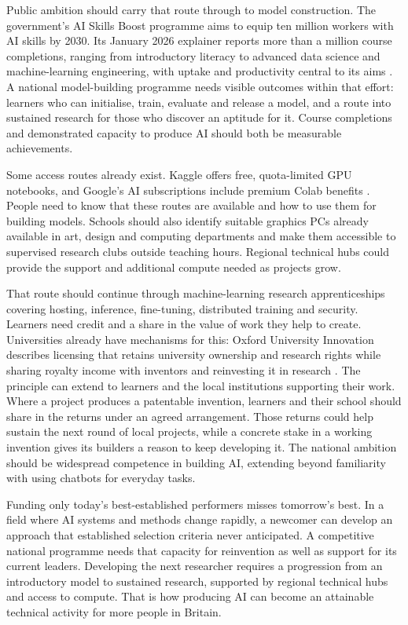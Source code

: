\documentclass[11pt,a4paper]{article}
\begin{document}
Public ambition should carry that route through to model construction.
The government's AI Skills Boost programme aims to equip ten million
workers with AI skills by 2030. Its January 2026 explainer reports more
than a million course completions, ranging from introductory literacy to
advanced data science and machine-learning engineering, with uptake and
productivity central to its aims \cite{aiskillsboost2026}. A national
model-building programme needs visible outcomes within that effort:
learners who can initialise, train, evaluate and release a model, and a
route into sustained research for those who discover an aptitude for it.
Course completions and demonstrated capacity to produce AI should both
be measurable achievements.

Some access routes already exist. Kaggle offers free, quota-limited GPU
notebooks, and Google's AI subscriptions include premium Colab benefits
\cite{kagglegpu,colab2026}. People need to know that these routes are
available and how to use them for building models. Schools should also
identify suitable graphics PCs already available in art, design and
computing departments and make them accessible to supervised research
clubs outside teaching hours. Regional technical hubs could provide the
support and additional compute needed as projects grow.

That route should continue through machine-learning research
apprenticeships covering hosting, inference, fine-tuning, distributed
training and security. Learners need credit and a share in the value of
work they help to create. Universities already have mechanisms for this:
Oxford University Innovation describes licensing that retains university
ownership and research rights while sharing royalty income with inventors
and reinvesting it in research \cite{oxfordlicensing}. The principle can
extend to learners and the local institutions supporting their work.
Where a project produces a patentable invention,
learners and their school should share in the returns under an agreed
arrangement. Those returns could help sustain the next round of local
projects, while a concrete stake in a working invention gives its builders
a reason to keep developing it. The national ambition should be widespread
competence in building AI, extending beyond familiarity with using chatbots
for everyday tasks.

Funding only today's best-established performers misses tomorrow's best.
In a field where AI systems and methods change rapidly, a newcomer can develop
an approach that established selection criteria never anticipated. A
competitive national programme needs that capacity for reinvention as
well as support for its current leaders. Developing the next researcher
requires a progression from an introductory model to sustained research,
supported by regional technical hubs and access to compute.
That is how producing AI can become an attainable technical activity for
more people in Britain.
\end{document}
